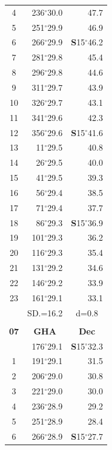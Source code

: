 \documentclass[10pt, a4paper]{report}
\begin{document}
\begin{scriptsize}
\begin{tabular*}{0.2\textwidth}[t]{@{\extracolsep{\fill}}|c|rr|}
4 & 236$^\circ$30.0 & 47.7\\
5 & 251$^\circ$29.9 & 46.9\\[2Pt]
6 & 266$^\circ$29.9 & \textbf{S}15$^\circ$46.2\\
7 & 281$^\circ$29.8 & 45.4\\
8 & 296$^\circ$29.8 & 44.6\\
9 & 311$^\circ$29.7 & \raisebox{0.24ex}{\boldmath$\cdot$~\boldmath$\cdot$~~}43.9\\
10 & 326$^\circ$29.7 & 43.1\\
11 & 341$^\circ$29.6 & 42.3\\[2Pt]
12 & 356$^\circ$29.6 & \textbf{S}15$^\circ$41.6\\
13 & 11$^\circ$29.5 & 40.8\\
14 & 26$^\circ$29.5 & 40.0\\
15 & 41$^\circ$29.5 & \raisebox{0.24ex}{\boldmath$\cdot$~\boldmath$\cdot$~~}39.3\\
16 & 56$^\circ$29.4 & 38.5\\
17 & 71$^\circ$29.4 & 37.7\\[2Pt]
18 & 86$^\circ$29.3 & \textbf{S}15$^\circ$36.9\\
19 & 101$^\circ$29.3 & 36.2\\
20 & 116$^\circ$29.3 & 35.4\\
21 & 131$^\circ$29.2 & \raisebox{0.24ex}{\boldmath$\cdot$~\boldmath$\cdot$~~}34.6\\
22 & 146$^\circ$29.2 & 33.9\\
23 & 161$^\circ$29.1 & 33.1\\
\hline
\rule{0pt}{2.4ex} & \multicolumn{1}{c}{SD.=16.2} & \multicolumn{1}{c|}{d=0.8}\\
\hline
\multicolumn{1}{c}{}\\[-0.5ex]\hline
\multicolumn{1}{|c|}{\rule{0pt}{2.6ex}\textbf{07}} & \multicolumn{1}{c}{\textbf{GHA}} & \multicolumn{1}{c|}{\textbf{Dec}}\\
\hline\rule{0pt}{2.6ex}\noindent
0 & 176$^\circ$29.1 & \textbf{S}15$^\circ$32.3\\
1 & 191$^\circ$29.1 & 31.5\\
2 & 206$^\circ$29.0 & 30.8\\
3 & 221$^\circ$29.0 & \raisebox{0.24ex}{\boldmath$\cdot$~\boldmath$\cdot$~~}30.0\\
4 & 236$^\circ$28.9 & 29.2\\
5 & 251$^\circ$28.9 & 28.4\\[2Pt]
6 & 266$^\circ$28.9 & \textbf{S}15$^\circ$27.7\\

\end{tabular*}
\end{scriptsize}
\end{document}
